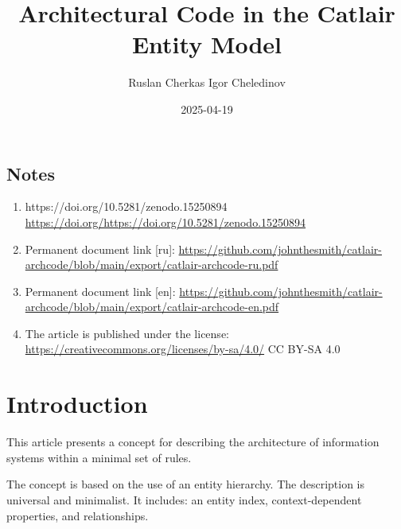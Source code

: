 \documentclass[final]{article}
\begin{document}
    \title{Architectural Code in the Catlair Entity Model}
    \author{
        Ruslan Cherkas
        Igor Cheledinov
    }
    \date{2025-04-19}

    \begin{small}
        \begingroup
        \renewcommand{\baselinestretch}{0.8}
        
        \renewcommand{\contentsname}{Contents}
        \maketitle
        \tableofcontents
        
        \section*{Notes}
            \begin{enumerate}
                \item https://doi.org/10.5281/zenodo.15250894
                \url{https://doi.org/https://doi.org/10.5281/zenodo.15250894}
                
                \item Permanent document link [ru]:
                \url{https://github.com/johnthesmith/catlair-archcode/blob/main/export/catlair-archcode-ru.pdf}

                \item Permanent document link [en]:
                \url{https://github.com/johnthesmith/catlair-archcode/blob/main/export/catlair-archcode-en.pdf}

                \item The article is published under the license:
                \url{https://creativecommons.org/licenses/by-sa/4.0/} CC BY-SA 4.0
            \end{enumerate}
        \endgroup
    \end{small}


    \section{Introduction}

        This article presents a concept for describing the architecture of information systems
        within a minimal set of rules.

        The concept is based on the use of an entity hierarchy. The description is universal and minimalist.
        It includes: an entity index, context-dependent properties, and relationships.
\end{document}
